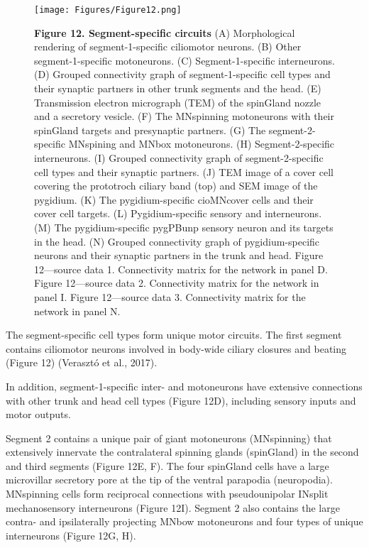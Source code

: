 \documentclass[
  11pt,
]{article}
\begin{document}
\begin{figure}[H]

{\centering \texttt{[image: Figures/Figure12.png]}

}

\caption{\textbf{Figure 12. Segment-specific circuits} (A) Morphological
rendering of segment-1-specific ciliomotor neurons. (B) Other
segment-1-specific motoneurons. (C) Segment-1-specific interneurons. (D)
Grouped connectivity graph of segment-1-specific cell types and their
synaptic partners in other trunk segments and the head. (E) Transmission
electron micrograph (TEM) of the spinGland nozzle and a secretory
vesicle. (F) The MNspinning motoneurons with their spinGland targets and
presynaptic partners. (G) The segment-2-specific MNspining and MNbox
motoneurons. (H) Segment-2-specific interneurons. (I) Grouped
connectivity graph of segment-2-specific cell types and their synaptic
partners. (J) TEM image of a cover cell covering the prototroch ciliary
band (top) and SEM image of the pygidium. (K) The pygidium-specific
cioMNcover cells and their cover cell targets. (L) Pygidium-specific
sensory and interneurons. (M) The pygidium-specific pygPBunp sensory
neuron and its targets in the head. (N) Grouped connectivity graph of
pygidium-specific neurons and their synaptic partners in the trunk and
head. Figure 12---source data 1. Connectivity matrix for the network in
panel D. Figure 12---source data 2. Connectivity matrix for the network
in panel I. Figure 12---source data 3. Connectivity matrix for the
network in panel N.}

\end{figure}%

The segment-specific cell types form unique motor circuits. The first
segment contains ciliomotor neurons involved in body-wide ciliary
closures and beating (Figure 12) (Verasztó et al., 2017).

In addition, segment-1-specific inter- and motoneurons have extensive
connections with other trunk and head cell types (Figure 12D), including
sensory inputs and motor outputs.

Segment 2 contains a unique pair of giant motoneurons (MNspinning) that
extensively innervate the contralateral spinning glands (spinGland) in
the second and third segments (Figure 12E, F). The four spinGland cells
have a large microvillar secretory pore at the tip of the ventral
parapodia (neuropodia). MNspinning cells form reciprocal connections
with pseudounipolar INsplit mechanosensory interneurons (Figure 12I).
Segment 2 also contains the large contra- and ipsilaterally projecting
MNbow motoneurons and four types of unique interneurons (Figure 12G, H).
\end{document}
